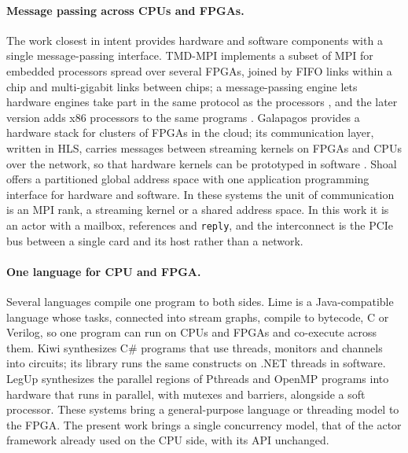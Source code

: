 \documentclass[11pt]{article}
\begin{document}
\paragraph{Message passing across CPUs and FPGAs.} The work closest in intent
provides hardware and software components with a single message-passing
interface.
TMD-MPI \cite{tmdmpi2006} implements a subset of MPI for embedded processors
spread over several FPGAs, joined by FIFO links within a chip and multi-gigabit
links between chips; a message-passing engine lets hardware engines take part
in the same protocol as the processors \cite{tmdmpi2006hw}, and the later
version adds x86 processors to the same programs \cite{tmdmpi2010}. Galapagos
\cite{galapagos2018} provides a hardware stack for clusters of FPGAs in the
cloud; its communication layer, written in HLS, carries messages between
streaming kernels on FPGAs and CPUs over the network, so that hardware kernels
can be prototyped in software \cite{galapagos2019}. Shoal
\cite{shoal2021} offers a partitioned global address space with one
application programming interface for hardware and software. In these systems
the unit of communication is an MPI rank, a streaming kernel or a shared
address space. In this work it is an actor with a mailbox, references and
\texttt{reply}, and the interconnect is the PCIe bus between a single card and
its host rather than a network.

\paragraph{One language for CPU and FPGA.} Several languages compile one
program to both sides. Lime \cite{lime2010} is a Java-compatible language whose
tasks, connected into stream graphs, compile to bytecode, C or Verilog, so one
program can run on CPUs and FPGAs and co-execute across them. Kiwi
\cite{kiwi2008} synthesizes C\# programs that use threads, monitors and
channels into circuits; its library runs the same constructs on .NET threads in
software. LegUp \cite{legup2013} synthesizes the parallel regions of Pthreads
and OpenMP programs into hardware that runs in parallel, with mutexes and
barriers, alongside a soft processor. These systems bring a general-purpose
language or threading model to the FPGA. The present work brings a single
concurrency model, that of the actor framework already used on the CPU side,
with its API unchanged.
\end{document}
